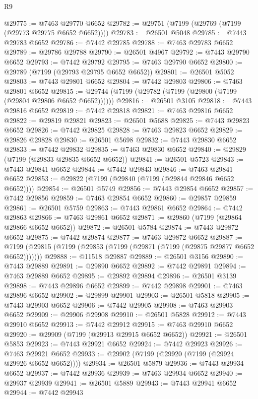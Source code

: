 \begin{lexlean}{R9}
\begin{coremodule}
@29775 := @7463 @29770 @6652
@29782 := @29751 (@7199 (@29769 (@7199 (@29773 @29775 @6652 @6652))))
@29783 := @26501 @5048
@29785 := @7443 @29783 @6652
@29786 := @7442 @29785
@29788 := @7463 @29783 @6652
@29789 := @29786 @29788
@29790 := @26501 @4967
@29792 := @7443 @29790 @6652
@29793 := @7442 @29792
@29795 := @7463 @29790 @6652
@29800 := @29789 (@7199 (@29793 @29795 @6652 @6652))
@29801 := @26501 @5052
@29803 := @7443 @29801 @6652
@29804 := @7442 @29803
@29806 := @7463 @29801 @6652
@29815 := @29744 (@7199 (@29782 (@7199 (@29800 (@7199 (@29804 @29806 @6652 @6652))))))
@29816 := @26501 @3105
@29818 := @7443 @29816 @6652
@29819 := @7442 @29818
@29821 := @7463 @29816 @6652
@29822 := @29819 @29821
@29823 := @26501 @5688
@29825 := @7443 @29823 @6652
@29826 := @7442 @29825
@29828 := @7463 @29823 @6652
@29829 := @29826 @29828
@29830 := @26501 @5698
@29832 := @7443 @29830 @6652
@29833 := @7442 @29832
@29835 := @7463 @29830 @6652
@29840 := @29829 (@7199 (@29833 @29835 @6652 @6652))
@29841 := @26501 @5723
@29843 := @7443 @29841 @6652
@29844 := @7442 @29843
@29846 := @7463 @29841 @6652
@29853 := @29822 (@7199 (@29840 (@7199 (@29844 @29846 @6652 @6652))))
@29854 := @26501 @5749
@29856 := @7443 @29854 @6652
@29857 := @7442 @29856
@29859 := @7463 @29854 @6652
@29860 := @29857 @29859
@29861 := @26501 @5759
@29863 := @7443 @29861 @6652
@29864 := @7442 @29863
@29866 := @7463 @29861 @6652
@29871 := @29860 (@7199 (@29864 @29866 @6652 @6652))
@29872 := @26501 @5784
@29874 := @7443 @29872 @6652
@29875 := @7442 @29874
@29877 := @7463 @29872 @6652
@29887 := @7199 (@29815 (@7199 (@29853 (@7199 (@29871 (@7199 (@29875 @29877 @6652 @6652)))))))
@29888 := @11518 @29887
@29889 := @26501 @3156
@29890 := @7443 @29889
@29891 := @29890 @6652
@29892 := @7442 @29891
@29894 := @7463 @29889 @6652
@29895 := @29892 @29894
@29896 := @26501 @3139
@29898 := @7443 @29896 @6652
@29899 := @7442 @29898
@29901 := @7463 @29896 @6652
@29902 := @29899 @29901
@29903 := @26501 @5818
@29905 := @7443 @29903 @6652
@29906 := @7442 @29905
@29908 := @7463 @29903 @6652
@29909 := @29906 @29908
@29910 := @26501 @5828
@29912 := @7443 @29910 @6652
@29913 := @7442 @29912
@29915 := @7463 @29910 @6652
@29920 := @29909 (@7199 (@29913 @29915 @6652 @6652))
@29921 := @26501 @5853
@29923 := @7443 @29921 @6652
@29924 := @7442 @29923
@29926 := @7463 @29921 @6652
@29933 := @29902 (@7199 (@29920 (@7199 (@29924 @29926 @6652 @6652))))
@29934 := @26501 @5879
@29936 := @7443 @29934 @6652
@29937 := @7442 @29936
@29939 := @7463 @29934 @6652
@29940 := @29937 @29939
@29941 := @26501 @5889
@29943 := @7443 @29941 @6652
@29944 := @7442 @29943

\end{coremodule}
\end{lexlean}
